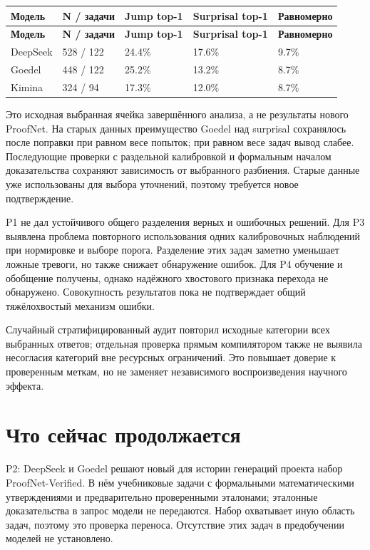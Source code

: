 \documentclass[11pt,a4paper]{article}
\begin{document}
\begingroup\fontsize{9.3}{12}\selectfont
\begin{longtable}{@{}P{20.78mm}P{34.14mm}P{31.17mm}P{31.17mm}P{31.17mm}@{}}
\toprule
\textbf{Модель} & \textbf{N / задачи} & \textbf{Jump top-1} & \textbf{Surprisal top-1} & \textbf{Равномерно} \\
\midrule
\endfirsthead
\toprule
\textbf{Модель} & \textbf{N / задачи} & \textbf{Jump top-1} & \textbf{Surprisal top-1} & \textbf{Равномерно} \\
\midrule
\endhead
\bottomrule
\endfoot
DeepSeek & 528 / 122 & 24.4\% & 17.6\% & 9.7\% \\[3pt]
Goedel & 448 / 122 & 25.2\% & 13.2\% & 8.7\% \\[3pt]
Kimina & 324 / 94 & 17.3\% & 12.0\% & 8.7\% \\[3pt]
\end{longtable}
\endgroup
Это исходная выбранная ячейка завершённого анализа, а не результаты нового ProofNet. На старых данных преимущество Goedel над surprisal сохранялось после поправки при равном весе попыток; при равном весе задач вывод слабее. Последующие проверки с раздельной калибровкой и формальным началом доказательства сохраняют зависимость от выбранного разбиения. Старые данные уже использованы для выбора уточнений, поэтому требуется новое подтверждение.

P1 не дал устойчивого общего разделения верных и ошибочных решений. Для P3 выявлена проблема повторного использования одних калибровочных наблюдений при нормировке и выборе порога. Разделение этих задач заметно уменьшает ложные тревоги, но также снижает обнаружение ошибок. Для P4 обучение и обобщение получены, однако надёжного хвостового признака перехода не обнаружено. Совокупность результатов пока не подтверждает общий тяжёлохвостый механизм ошибки.

Случайный стратифицированный аудит повторил исходные категории всех выбранных ответов; отдельная проверка прямым компилятором также не выявила несогласия категорий вне ресурсных ограничений. Это повышает доверие к проверенным меткам, но не заменяет независимого воспроизведения научного эффекта.

\section{Что сейчас продолжается}
P2: DeepSeek и Goedel решают новый для истории генераций проекта набор ProofNet-Verified. В нём учебниковые задачи с формальными математическими утверждениями и предварительно проверенными эталонами; эталонные доказательства в запрос модели не передаются. Набор охватывает иную область задач, поэтому это проверка переноса. Отсутствие этих задач в предобучении моделей не установлено.
\end{document}
